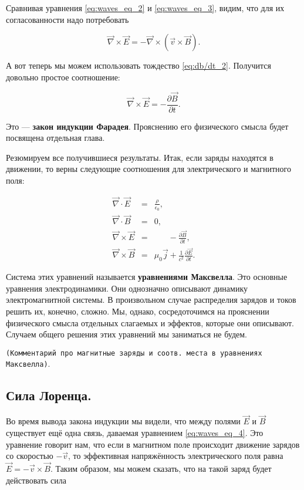 \documentclass[a4paper,12pt]{article}
\numberwithin{equation}{section}
\newcommand{\pt}{\partial}
\newcommand{\eps}{\epsilon}
\newcommand{\com}[1]{{\Large{\texttt{{\color{red}(#1)}}}}}
\newcommand{\vn}{\vec{\nabla}}
\begin{document}
Сравнивая уравнения \eqref{eq:waves_eq_2} и \eqref{eq:waves_eq_3},
видим, что для их согласованности надо потребовать

\begin{equation}
  \label{eq:waves_eq_4}
  \vn \times \vec{E} = - \vn \times \left( \vec{v} \times \vec{B}  \right).
\end{equation}

А вот теперь мы можем использовать тождество
\eqref{eq:db/dt_2}. Получится довольно простое соотношение: 

\begin{equation}
  \label{eq:faradays_law}
  \vn \times \vec{E} = -\frac{\pt \vec{B}}{\pt t}.
\end{equation}

Это --- \textbf{закон индукции Фарадея}. Прояснению его физического
смысла будет посвящена отдельная глава. 

Резюмируем все получившиеся результаты. Итак, если заряды находятся в
движении, то верны следующие соотношения для электрического и
магнитного поля: 

\begin{eqnarray}
  \label{eq:maxwell_eqs}
  \vn \cdot \vec{E} &=& \frac{\rho}{\eps_0},\\
  \vn \cdot \vec{B} &=& 0,\\
  \vn \times \vec{E} &=& \phantom{\mu_0 \vec{j}} -\frac{\pt \vec{B}}{\pt t},\\
  \vn \times \vec{B} &=& \mu_0 \vec{j} + \frac{1}{c^2}\frac{\pt
    \vec{E}}{\pt t}.
\end{eqnarray}

Система этих уравнений называется \textbf{уравнениями Максвелла}. Это
основные уравнения электродинамики. Они однозначно описывают динамику
электромагнитной системы. В произвольном случае распределия зарядов и
токов решить их, конечно, сложно. Мы, однако, сосредоточимся на
прояснении физического смысла отдельных слагаемых и эффектов, которые
они описывают. Случаем общего решения этих уравнений мы заниматься не
будем. 

\com{Комментарий про магнитные заряды и соотв. места в уравнениях
  Максвелла}. 

\subsection{Сила Лоренца.}
\label{sec:lorentz_force}

Во время вывода закона индукции мы видели, что между полями $\vec{E}$
и $\vec{B}$ существует ещё одна связь, даваемая уравнением
\eqref{eq:waves_eq_4}. Это уравнение говорит нам, что если в магнитном
поле происходит движение зарядов со скоростью $-\vec{v}$, то
эффективная напряжённость электрического поля равна $\vec{E} =
-\vec{v} \times \vec{B}$. Таким образом, мы можем сказать, что на
такой заряд будет действовать сила
\end{document}
